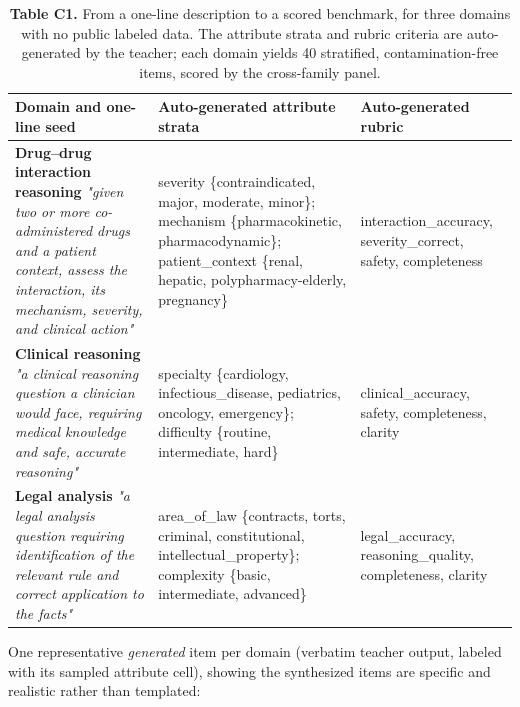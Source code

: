 \begin{table}[t]
\centering
\small\setlength{\tabcolsep}{4pt}%
\caption{\textbf{Table C1.} From a one-line description to a scored benchmark, for three domains with no
public labeled data. The attribute strata and rubric criteria are auto-generated by the teacher; each domain yields
40 stratified, contamination-free items, scored by the cross-family panel.}
\setlength{\tabcolsep}{4pt}
\begin{tabularx}{\textwidth}{>{\hsize=1.214\hsize\raggedright\arraybackslash}X >{\hsize=1.193\hsize\raggedright\arraybackslash}X >{\hsize=0.593\hsize\raggedright\arraybackslash}X}
\toprule
Domain and one-line seed & Auto-generated attribute strata & Auto-generated rubric \\
\midrule
\textbf{Drug--drug interaction reasoning}\newline 
\emph{"given two or more co-administered drugs and a patient context, assess the interaction, its mechanism, severity, and clinical action"} & severity \{contraindicated, major, moderate, minor\}; mechanism \{pharmacokinetic, pharmacodynamic\};
patient\_\allowbreak{}context \{renal, hepatic, polypharmacy-elderly, pregnancy\} & interaction\_\allowbreak{}accuracy, severity\_\allowbreak{}correct, safety, completeness \\
\textbf{Clinical reasoning}\newline 
\emph{"a clinical reasoning question a clinician would face, requiring medical knowledge and safe, accurate reasoning"} & specialty \{cardiology, infectious\_\allowbreak{}disease, pediatrics, oncology, emergency\}; difficulty \{routine, intermediate, hard\} & clinical\_\allowbreak{}accuracy, safety, completeness, clarity \\
\textbf{Legal analysis}\newline 
\emph{"a legal analysis question requiring identification of the relevant rule and correct application to the facts"} & area\_\allowbreak{}of\_\allowbreak{}law \{contracts, torts, criminal, constitutional, intellectual\_\allowbreak{}property\}; complexity \{basic, intermediate, advanced\} & legal\_\allowbreak{}accuracy, reasoning\_\allowbreak{}quality, completeness, clarity \\
\bottomrule
\end{tabularx}
\end{table}

One representative \emph{generated} item per domain (verbatim teacher output, labeled with its sampled attribute
cell), showing the synthesized items are specific and realistic rather than templated:

